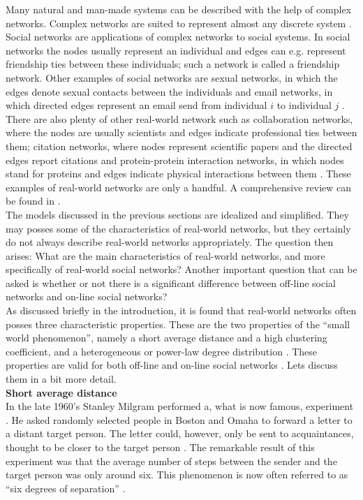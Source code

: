 \documentclass[11 pt , letterpaper , twoside , openright]{book}
\begin{document}
Many natural and man-made systems can be described with the help of complex networks. Complex networks are suited to represent almost any discrete system \cite{Costa2008}. Social networks are applications of complex networks to social systems. In social networks the nodes usually represent an individual and edges can e.g. represent friendship ties between these individuals; such a network is called a friendship network. Other examples of social networks are sexual networks, in which the edges denote sexual contacts between the individuals and email networks, in which directed edges represent an email send from individual $i$ to individual $j$ \cite{Costa2008}. There are also plenty of other real-world network such as collaboration networks, where the nodes are usually scientists and edges indicate professional ties between them; citation networks, where nodes represent scientific papers and the directed edges report citations and protein-protein interaction networks, in which nodes stand for proteins and edges indicate physical interactions between them \cite{Costa2008}. These examples of real-world networks are only a handful. A comprehensive review can be found in \cite{Costa2008}.\\
\newline
The models discussed in the previous sections are idealized and simplified. They may posses some of the characteristics of real-world networks, but they certainly do not always describe real-world networks appropriately. The question then arises: What are the main characteristics of real-world networks, and more specifically of real-world social networks? Another important question that can be asked is whether or not there is a significant difference between off-line social networks and on-line social networks?\\
\newline
As discussed briefly in the introduction, it is found that real-world networks often posses three characteristic properties. These are the two properties of the ``small world phenomenon'', namely a short average distance and a high clustering coefficient, and a heterogeneous or power-law degree distribution \cite{RealWorld}. These properties are valid for both off-line and on-line social networks \cite{Zhang2014}. Lets discuss them in a bit more detail.\\
\newline
\textbf{Short average distance}\\
\newline
In the late 1960's Stanley Milgram performed a, what is now famous, experiment \cite{Newman2003}. He asked randomly selected people in Boston and Omaha to forward a letter to a distant target person. The letter could, however, only be sent to acquaintances, thought to be closer to the target person \cite{RealWorld}. The remarkable result of this experiment was that the average number of steps between the sender and the target person was only around six. This phenomenon is now often referred to as ``six degrees of separation'' \cite{RealWorld}.\\
\end{document}
